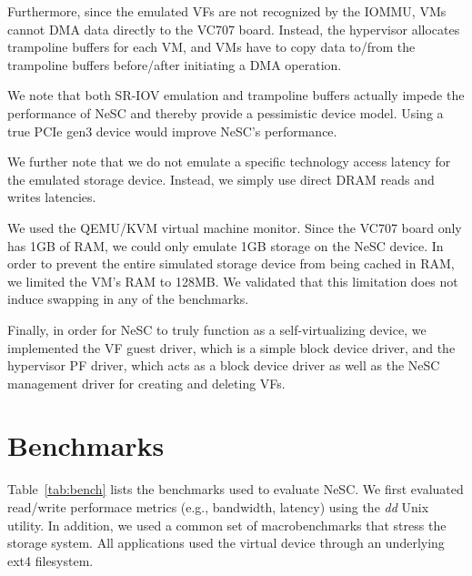 Furthermore, since the emulated VFs are not recognized by the IOMMU, VMs cannot DMA data directly to the VC707 board. Instead, the hypervisor allocates trampoline buffers for each VM, and VMs have to copy data to/from the trampoline buffers before/after initiating a DMA operation.

We note that both SR-IOV emulation and trampoline buffers actually impede the performance of NeSC and thereby provide a pessimistic device model. Using a true PCIe gen3 device would improve NeSC's performance.

We further note that we do not emulate a specific technology access latency for the emulated storage device. Instead, we simply use direct DRAM reads and writes latencies.

We used the QEMU/KVM virtual machine monitor. Since the VC707 board only has 1GB of RAM, we could only emulate 1GB storage on the NeSC device. In order to prevent the entire simulated storage device from being cached in RAM, we limited the VM's RAM to 128MB. We validated that this limitation does not induce swapping in any of the benchmarks.

Finally, in order for NeSC to truly function as a self-virtualizing device, we implemented the VF guest driver, which is a simple block device driver, and the hypervisor PF driver, which acts as a block device driver as well as the NeSC management driver for creating and deleting VFs.  

\section*{Benchmarks}
Table~\ref{tab:bench} lists the benchmarks used to evaluate NeSC.
We first evaluated read/write performace metrics (e.g., bandwidth, latency) using the \emph{dd} Unix utility.
In addition, we used a common set of macrobenchmarks that stress the storage system.
All applications used the virtual device through an underlying ext4 filesystem.

